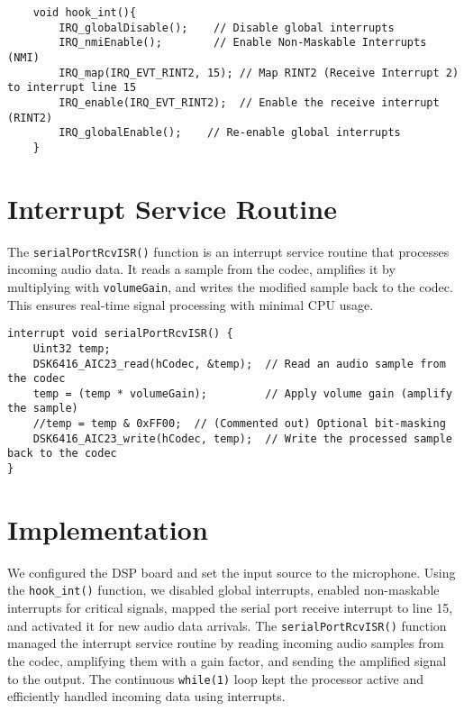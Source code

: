 \documentclass{article}
\begin{document}
\begin{lstlisting}
    void hook_int(){
        IRQ_globalDisable();    // Disable global interrupts
        IRQ_nmiEnable();        // Enable Non-Maskable Interrupts (NMI)
        IRQ_map(IRQ_EVT_RINT2, 15); // Map RINT2 (Receive Interrupt 2) to interrupt line 15
        IRQ_enable(IRQ_EVT_RINT2);  // Enable the receive interrupt (RINT2)
        IRQ_globalEnable();    // Re-enable global interrupts
    }

\end{lstlisting}

\section*{Interrupt Service Routine}

The \texttt{serialPortRcvISR()} function is an interrupt service routine that processes incoming audio data. It reads a sample from the codec, amplifies it by multiplying with \texttt{volumeGain}, and writes the modified sample back to the codec. This ensures real-time signal processing with minimal CPU usage.

\begin{lstlisting}
interrupt void serialPortRcvISR() {
    Uint32 temp;
    DSK6416_AIC23_read(hCodec, &temp);  // Read an audio sample from the codec
    temp = (temp * volumeGain);         // Apply volume gain (amplify the sample)
    //temp = temp & 0xFF00;  // (Commented out) Optional bit-masking
    DSK6416_AIC23_write(hCodec, temp);  // Write the processed sample back to the codec
}
\end{lstlisting}


\section*{Implementation}

We configured the DSP board and set the input source to the microphone. Using the \texttt{hook\_int()} function, we disabled global interrupts, enabled non-maskable interrupts for critical signals, mapped the serial port receive interrupt to line 15, and activated it for new audio data arrivals. The \texttt{serialPortRcvISR()} function managed the interrupt service routine by reading incoming audio samples from the codec, amplifying them with a gain factor, and sending the amplified signal to the output. The continuous \texttt{while(1)} loop kept the processor active and efficiently handled incoming data using interrupts.
\end{document}
